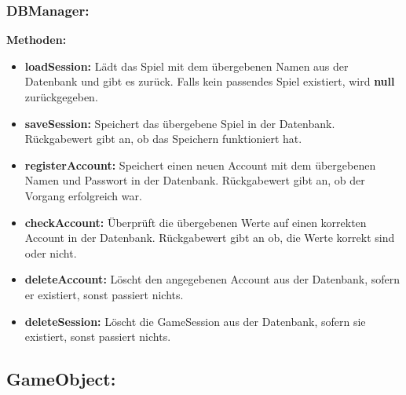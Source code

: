 \documentclass[fontsize=12pt,paper=a4,twoside]{scrartcl}
\begin{document}
\subsubsection{DBManager:}
\textbf{Methoden:}
\begin{itemize}
	\item \textbf{loadSession:} Lädt das Spiel mit dem übergebenen Namen aus der Datenbank und gibt es zurück. Falls kein passendes Spiel existiert, wird \textbf{null} zurückgegeben.
	\item \textbf{saveSession:} Speichert das übergebene Spiel in der Datenbank. Rückgabewert gibt an, ob das Speichern funktioniert hat.
	\item \textbf{registerAccount:} Speichert einen neuen Account mit dem übergebenen Namen und Passwort in der Datenbank. Rückgabewert gibt an, ob der Vorgang erfolgreich war.
	\item \textbf{checkAccount:} Überprüft die übergebenen Werte auf einen korrekten Account in der Datenbank. Rückgabewert gibt an ob, die Werte korrekt sind oder nicht.
	\item \textbf{deleteAccount:} Löscht den angegebenen Account aus der Datenbank, sofern er existiert, sonst passiert nichts.
	\item \textbf{deleteSession:} Löscht die GameSession aus der Datenbank, sofern sie existiert, sonst passiert nichts.
\end{itemize}


\subsection{GameObject:}
\end{document}
